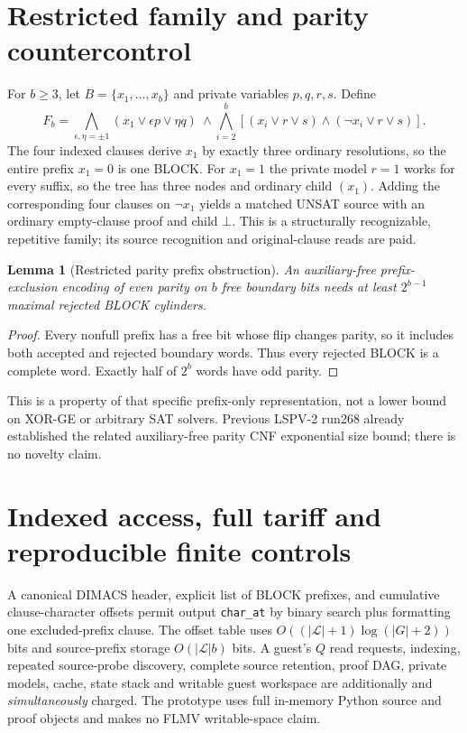 \documentclass[11pt]{article}
\newtheorem{lemma}{Lemma}
\begin{document}
\section{Restricted family and parity countercontrol}
For $b\ge3$, let $B=\{x_1,\ldots,x_b\}$ and private variables $p,q,r,s$. Define
\[
F_b=\bigwedge_{\epsilon,\eta=\pm1}(x_1\lor\epsilon p\lor\eta q)
\ \land\!\!\bigwedge_{i=2}^b[(x_i\lor r\lor s)\land(\neg x_i\lor r\lor s)].
\]
The four indexed clauses derive $x_1$ by exactly three ordinary resolutions, so the entire prefix $x_1=0$ is one BLOCK. For $x_1=1$ the private model $r=1$ works for every suffix, so the tree has three nodes and ordinary child $(x_1)$. Adding the corresponding four clauses on $\neg x_1$ yields a matched UNSAT source with an ordinary empty-clause proof and child $\bot$. This is a structurally recognizable, repetitive family; its source recognition and original-clause reads are paid.

\begin{lemma}[Restricted parity prefix obstruction]
An auxiliary-free prefix-exclusion encoding of even parity on $b$ free boundary bits needs at least $2^{b-1}$ maximal rejected BLOCK cylinders.
\end{lemma}
\begin{proof}
Every nonfull prefix has a free bit whose flip changes parity, so it includes both accepted and rejected boundary words. Thus every rejected BLOCK is a complete word. Exactly half of $2^b$ words have odd parity. \qedhere
\end{proof}
This is a property of that specific prefix-only representation, not a lower bound on XOR-GE or arbitrary SAT solvers. Previous LSPV-2 run268 already established the related auxiliary-free parity CNF exponential size bound; there is no novelty claim.

\section{Indexed access, full tariff and reproducible finite controls}
A canonical DIMACS header, explicit list of BLOCK prefixes, and cumulative clause-character offsets permit output \texttt{char\_at} by binary search plus formatting one excluded-prefix clause. The offset table uses $O((|\mathcal L|+1)\log(|G|+2))$ bits and source-prefix storage $O(|\mathcal L|b)$ bits. A guest's $Q$ read requests, indexing, repeated source-probe discovery, complete source retention, proof DAG, private models, cache, state stack and writable guest workspace are additionally and \emph{simultaneously} charged. The prototype uses full in-memory Python source and proof objects and makes no FLMV writable-space claim.
\end{document}
